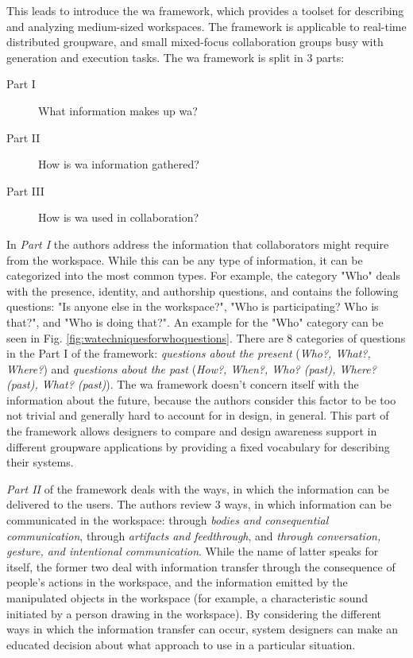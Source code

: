 This leads \cite{gutwin_descriptive_2002} to introduce the \gls{wa} framework, which provides a toolset for describing and analyzing medium-sized workspaces. The framework is applicable to real-time distributed groupware, and small mixed-focus collaboration groups busy with generation and execution tasks.
The \gls{wa} framework is split in 3 parts:
\begin{description}
	\item[Part I] What information makes up \gls{wa}?
	\item[Part II] How is \gls{wa} information gathered?
	\item[Part III] How is \gls{wa} used in collaboration? 
\end{description}

In \textit{Part I} the authors address the information that collaborators might require from the workspace. While this can be any type of information, it can be categorized into the most common types. For example, the category "Who" deals with the presence, identity, and authorship questions, and contains the following questions: "Is anyone else in the workspace?", "Who is participating? Who is that?", and "Who is doing that?". An example for the "Who" category can be seen in Fig. \ref{fig:watechniquesforwhoquestions}. There are 8 categories of questions in the Part I of the framework: \textit{questions about the present} (\textit{Who?, What?, Where?}) and \textit{questions about the past} (\textit{How?, When?, Who? (past), Where? (past), What? (past)}). The \gls{wa} framework doesn't concern itself with the information about the future, because the authors consider this factor to be too not trivial and generally hard to account for in design, in general.
This part of the framework allows designers to compare and design awareness support in different groupware applications by providing a fixed vocabulary for describing their systems.

\textit{Part II} of the framework deals with the ways, in which the information can be delivered to the users. The authors review 3 ways, in which information can be communicated in the workspace: through \textit{bodies and consequential communication}, through \textit{artifacts and feedthrough}, and \textit{through conversation, gesture, and intentional communication}. While the name of latter speaks for itself, the former two deal with information transfer through the consequence of people's actions in the workspace, and the information emitted by the manipulated objects in the workspace (for example, a characteristic sound initiated by a person drawing in the workspace).
By considering the different ways in which the information transfer can occur, system designers can make an educated decision about what approach to use in a particular situation.

